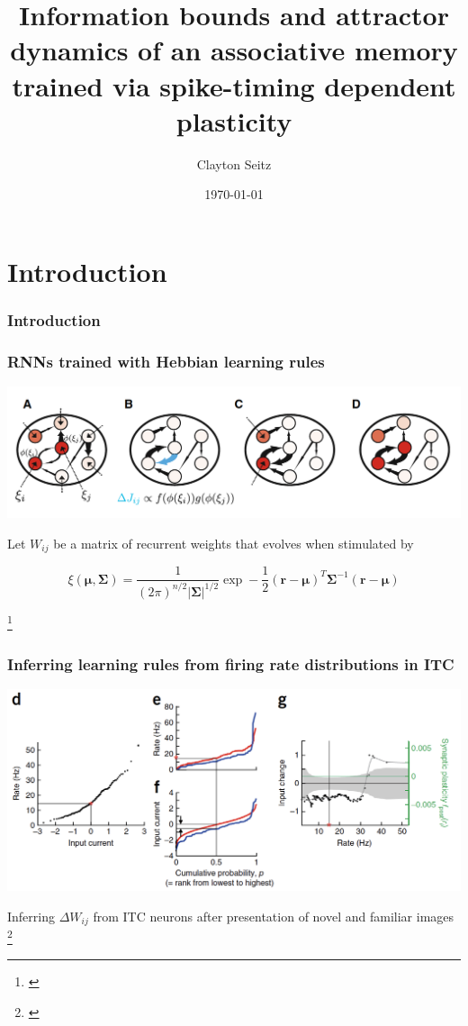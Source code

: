 \documentclass{beamer}
\begin{document}
\title{Information bounds and attractor dynamics of an associative memory trained via spike-timing dependent plasticity}  
\author{Clayton Seitz}
\date{\today} 

\begin{frame}[plain]
\titlepage
\end{frame}

\section{Introduction} 

\begin{frame}[plain]
\frametitle{Introduction} 

\end{frame}

\begin{frame}[plain]
\frametitle{RNNs trained with Hebbian learning rules}

\begin{center}
\includegraphics[scale=0.5]{network-diagram}
\end{center}

Let $W_{ij}$ be a matrix of recurrent weights that evolves when stimulated by 

\begin{equation*}
\xi(\bm{\mu}, \bm{\Sigma}) = \frac{1}{(2\pi)^{n/2}|\bm{\Sigma}|^{1/2}}\exp-\frac{1}{2}(\bm{r}-\bm{\mu})^{T}\bm{\Sigma}^{-1}(\bm{r}-\bm{\mu})
\end{equation*}

\footnote{\cite{peirera}}

\end{frame}

\begin{frame}[plain]
\frametitle{Inferring learning rules from firing rate distributions in ITC}

\begin{center}
\includegraphics[scale=0.5]{learning-rules}
\end{center}

Inferring $\Delta W_{ij}$ from ITC neurons after presentation of novel and familiar images
\footnote{\cite{lim}}

\end{frame}
\end{document}
